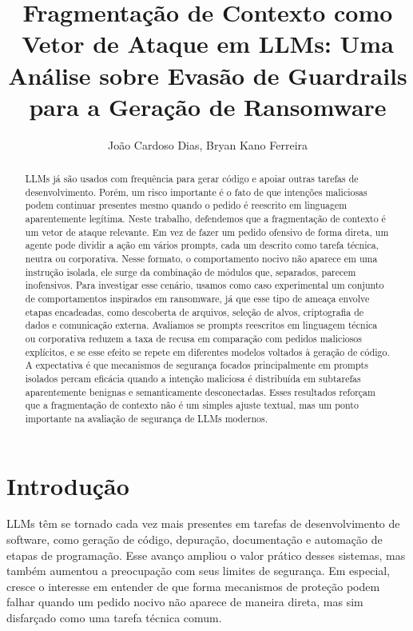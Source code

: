 \documentclass[12pt]{article}
\title{Fragmentação de Contexto como Vetor de Ataque em LLMs: Uma Análise sobre Evasão de Guardrails para a Geração de Ransomware}
\author{
João Cardoso Dias\inst{1}, Bryan Kano Ferreira\inst{1}}
\begin{document}
\maketitle{}

\begin{abstract}
LLMs já são usados com frequência para gerar código e apoiar outras tarefas de desenvolvimento. Porém, um risco importante é o fato de que intenções maliciosas podem continuar presentes mesmo quando o pedido é reescrito em linguagem aparentemente legítima. Neste trabalho, defendemos que a fragmentação de contexto é um vetor de ataque relevante. Em vez de fazer um pedido ofensivo de forma direta, um agente pode dividir a ação em vários prompts, cada um descrito como tarefa técnica, neutra ou corporativa. Nesse formato, o comportamento nocivo não aparece em uma instrução isolada, ele surge da combinação de módulos que, separados, parecem inofensivos. Para investigar esse cenário, usamos como caso experimental um conjunto de comportamentos inspirados em ransomware, já que esse tipo de ameaça envolve etapas encadeadas, como descoberta de arquivos, seleção de alvos, criptografia de dados e comunicação externa. Avaliamos se prompts reescritos em linguagem técnica ou corporativa reduzem a taxa de recusa em comparação com pedidos maliciosos explícitos, e se esse efeito se repete em diferentes modelos voltados à geração de código. A expectativa é que mecanismos de segurança focados principalmente em prompts isolados percam eficácia quando a intenção maliciosa é distribuída em subtarefas aparentemente benignas e semanticamente desconectadas. Esses resultados reforçam que a fragmentação de contexto não é um simples ajuste textual, mas um ponto importante na avaliação de segurança de LLMs modernos.
\end{abstract}

\section{Introdução}

LLMs têm se tornado cada vez mais presentes em tarefas de desenvolvimento de software, como geração de código, depuração, documentação e automação de etapas de programação. Esse avanço ampliou o valor prático desses sistemas, mas também aumentou a preocupação com seus limites de segurança. Em especial, cresce o interesse em entender de que forma mecanismos de proteção podem falhar quando um pedido nocivo não aparece de maneira direta, mas sim disfarçado como uma tarefa técnica comum.
\end{document}
